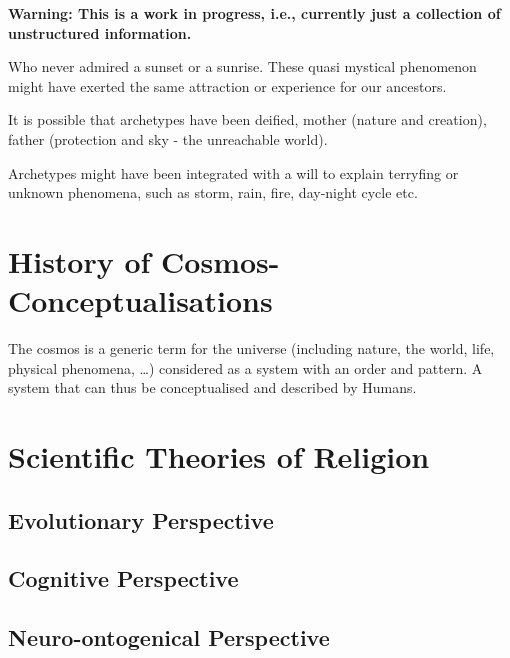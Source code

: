\documentclass[]{book}
\begin{document}
\textbf{Warning: This is a work in progress, i.e., currently just a collection of unstructured information.}

Who never admired a sunset or a sunrise. These quasi mystical phenomenon might have exerted the same attraction or experience for our ancestors.

It is possible that archetypes have been deified, mother (nature and creation), father (protection and sky - the unreachable world).

Archetypes might have been integrated with a will to explain terryfing or unknown phenomena, such as storm, rain, fire, day-night cycle etc.

\hypertarget{history-of-cosmos-conceptualisations}{%
\section{History of Cosmos-Conceptualisations}\label{history-of-cosmos-conceptualisations}}

The cosmos is a generic term for the universe (including nature, the world, life, physical phenomena, \ldots) considered as a system with an order and pattern. A system that can thus be conceptualised and described by Humans.

\citep{peoples2016hunter}

\hypertarget{scientific-theories-of-religion}{%
\section{Scientific Theories of Religion}\label{scientific-theories-of-religion}}

\hypertarget{evolutionary-perspective}{%
\subsection{Evolutionary Perspective}\label{evolutionary-perspective}}

\hypertarget{cognitive-perspective}{%
\subsection{Cognitive Perspective}\label{cognitive-perspective}}

\hypertarget{neuro-ontogenical-perspective}{%
\subsection{Neuro-ontogenical Perspective}\label{neuro-ontogenical-perspective}}
\end{document}
